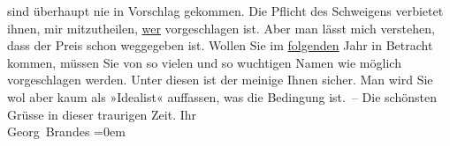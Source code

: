                     sind überhaupt nie in Vorschlag gekommen. Die Pflicht des Schweigens verbietet
                    ihnen, mir mitzutheilen, \uline{wer} vorgeschlagen ist.
                    Aber man lässt mich verstehen, dass der Preis schon weggegeben ist.\pend
           \pstart
           Wollen Sie im \uline{folgenden} Jahr in Betracht kommen,
                    müssen Sie  von so vielen und so
                    wuchtigen Namen wie möglich vorgeschlagen werden. Unter diesen ist der meinige
                    Ihnen sicher. Man wird Sie wol aber kaum als »Idealist« auffassen, was die
                    Bedingung ist. – Die schönsten Grüsse in dieser traurigen Zeit.\pend
           \pstart
           Ihr{\\[\baselineskip]}\spacefill\mbox{Georg Brandes}\pend
           \leftskip=0em{}\endnumbering{}  
      